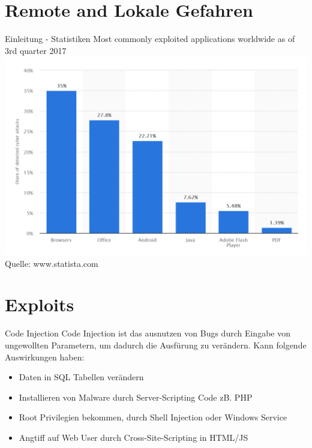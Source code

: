 \documentclass[10pt]{beamer}
\begin{document}

\section{Remote and Lokale Gefahren}

\begin{frame}[fragile]{Einleitung - Statistiken}
  Most commonly exploited applications worldwide as of 3rd quarter 2017
  \newline
  \includegraphics[scale=0.5]{cyberattacks_2017}
  \newline
  Quelle: www.statista.com
\end{frame}



\section{Exploits}

\begin{frame}[fragile]{Code Injection}
  Code Injection ist das ausnutzen von Bugs durch Eingabe von ungewollten Parametern, um dadurch die Ausf\"urung zu ver\"andern.
  \newline
  Kann folgende Auswirkungen haben:
  \begin{itemize}
    \item Daten in SQL Tabellen ver\"andern
    \item Installieren von Malware durch Server-Scripting Code zB. PHP
    \item Root Privilegien bekommen, durch Shell Injection oder Windows Service
    \item Angtiff auf Web User durch Cross-Site-Scripting in HTML/JS
  \end{itemize}
\end{frame}
\end{document}
